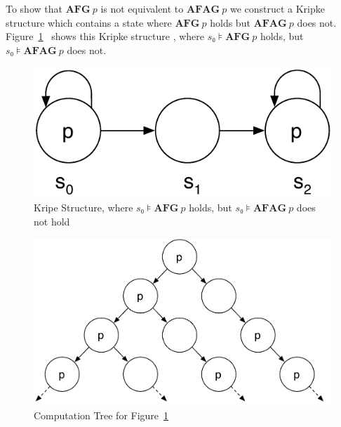 To show that $\mathbf{AFG}~p$ is not equivalent to $\mathbf{AFAG}~p$ we
construct a Kripke structure which contains a state where $\mathbf{AFG}~p$
holds but $\mathbf{AFAG}~p$ does not.
Figure~\ref{figure:Kripke_Structure_Exercise_6}~\cite{Veith2011ExerciseSolutions} shows this Kripke structure
, where $s₀⊧\mathbf{AFG}~p$ holds, but
$s₀⊧\mathbf{AFAG}~p$ does not.

\begin{figure}[htbp]
    \centering
        \includegraphics[width=.4\textwidth]
            {Figures/Kripke Structure Exercise 6.pdf}
    \caption{Kripe Structure, where $s₀⊧\mathbf{AFG}~p$ holds, but
             $s₀⊧\mathbf{AFAG}~p$ does not hold}
    \label{figure:Kripke_Structure_Exercise_6}
\end{figure}

\begin{figure}[htbp]
    \centering
        \includegraphics[width=.7\textwidth]
            {Figures/Computation Tree Exercise 6.pdf}
    \caption{Computation Tree for
             Figure~\ref{figure:Kripke_Structure_Exercise_6}}
    \label{figure:Computation_Tree_Exercise_6}
\end{figure}

